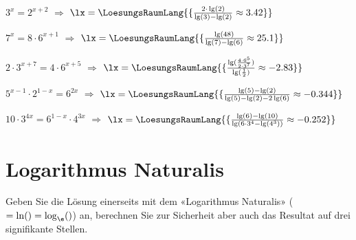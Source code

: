 \begin{bbwAufgabenBlock}
\item $3^x=2^{x+2}$ $\Longrightarrow$ $\lx=\LoesungsRaumLang{\{\frac{2\cdot{}\lg(2)}{\lg(3)-\lg(2)} \approx  3.42  \}}$ 
\item $7^x=8\cdot{}6^{x+1}$ $\Longrightarrow$ $\lx=\LoesungsRaumLang{\{\frac{\lg(48)}{\lg(7)-\lg(6)} \approx 25.1   \}}$ \noTRAINER{\seitenUmbruchImAufgabenteil{}}
\item $2\cdot{}3^{x+7}=4\cdot{}6^{x+5}$ $\Longrightarrow$ $\lx=\LoesungsRaumLang{\{\frac{\lg(\frac{4\cdot{}6^5}{2\cdot{}3^7})}{\lg(\frac12)} \approx  -2.83  \}}$ 
\item $5^{x-1}\cdot{}2^{1-x}=6^{2x}$ $\Longrightarrow$ $\lx=\LoesungsRaumLang{\{\frac{\lg(5)-\lg(2)}{\lg(5)-\lg(2)-2\lg(6)} \approx -0.344   \}}$ \noTRAINER{\seitenUmbruchImAufgabenteil{}}
\item $10\cdot{}3^{4x} = 6^{1-x}\cdot{}4^{3x}$ $\Longrightarrow$ $\lx=\LoesungsRaumLang{\{\frac{\lg(6)-\lg(10)}{\lg(6\cdot{}3^4 - \lg(4^3))} \approx -0.252   \}}$ 
\end{bbwAufgabenBlock}

\noTRAINER{\seitenUmbruchImAufgabenteil{}}

\section{Logarithmus Naturalis}
Geben Sie die Lösung einerseits mit dem «Logarithmus Naturalis»
($=\ln() = \log_{\e}()$) an, berechnen Sie zur Sicherheit aber auch das
Resultat auf drei signifikante Stellen.

